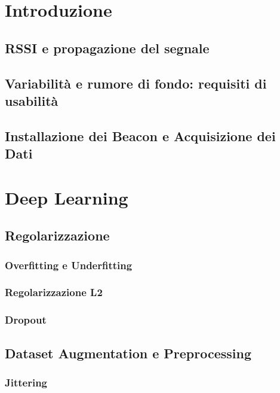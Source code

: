 \documentclass[12pt]{report}
\begin{document}
\begin{abstract}
  
\end{abstract}

\tableofcontents

\chapter{Introduzione}

\section{RSSI e propagazione del segnale}
\section{Variabilità e rumore di fondo: requisiti di usabilità}
\section{Installazione dei Beacon e Acquisizione dei Dati}

\chapter{Deep Learning}


\section{Regolarizzazione}
\subsection{Overfitting e Underfitting}
\subsection{Regolarizzazione L2}
\subsection{Dropout}
\section{Dataset Augmentation e Preprocessing}
\subsection{Jittering}
\end{document}
